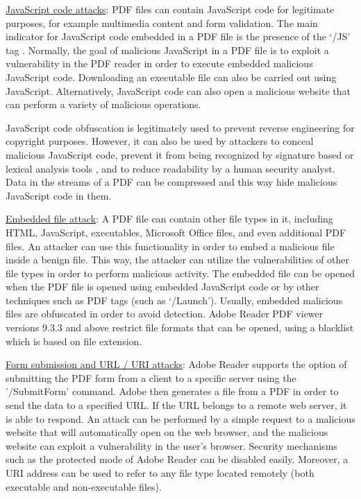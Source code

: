 \documentclass{article}
\begin{document}
\indent \underline{JavaScript code attacks}: PDF files can contain JavaScript code for legitimate purposes, for example multimedia content and form validation. The main indicator for JavaScript code embedded in a PDF file is the presence of the ‘/JS’ tag \cite{1} \cite{JSSrndic2011Laskov} \cite{Bonan2018ML} \cite{JAST2018}. Normally, the goal of malicious JavaScript in a PDF file is to exploit a vulnerability in the PDF reader in order to execute embedded malicious JavaScript code. Downloading an executable file can also be carried out using JavaScript. Alternatively, JavaScript code can also open a malicious website that can perform a variety of malicious operations.

\indent JavaScript code obfuscation is legitimately used to prevent reverse engineering for copyright purposes. However, it can also be used by attackers to conceal malicious JavaScript code, prevent it from being recognized by signature based or lexical analysis tools \cite{JSSrndic2011Laskov}, and to reduce readability by a human security analyst. Data in the streams of a PDF can be compressed and this way hide malicious JavaScript code in them.

\indent \underline{Embedded file attack}: A PDF file can contain other file types in it, including HTML, JavaScript, executables, Microsoft Office files, and even additional PDF files. An attacker can use this functionality in order to embed a malicious file inside a benign file. This way, the attacker can utilize the vulnerabilities of other file types in order to perform malicious activity. The embedded file can be opened when the PDF file is opened using embedded JavaScript code or by other techniques such as PDF tags (such as ‘/Launch’). Usually, embedded malicious files are obfuscated in order to avoid detection. Adobe Reader PDF viewer versions 9.3.3 and above restrict file formats that can be opened, using a blacklist which is based on file extension.

\indent \underline{Form submission and URL / URI attacks}: Adobe Reader supports the option of submitting the PDF form from a client to a specific server using the '/SubmitForm’ command. Adobe then generates a file from a PDF in order to send the data to a specified URL. If the URL belongs to a remote web server, it is able to respond. An attack can be performed by a simple request to a malicious website that will automatically open on the web browser, and the malicious website can exploit a vulnerability in the user's browser. Security mechanisms such as the protected mode of Adobe Reader can be disabled easily. Moreover, a URI address can be used to refer to any file type located remotely (both executable and non-executable files).
\end{document}
